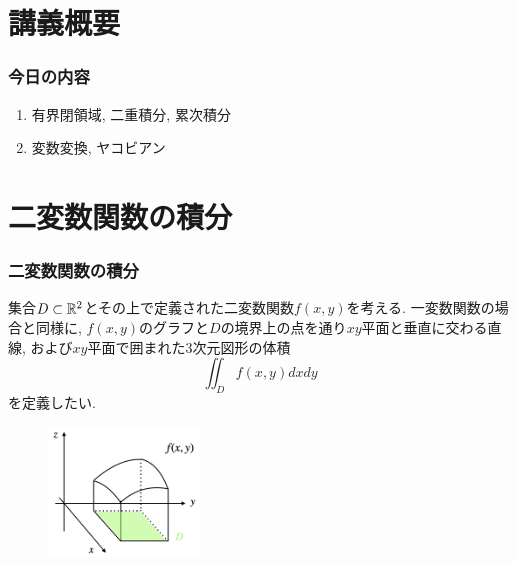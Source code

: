 
\section{講義概要}


\begin{frame}
\frametitle{今日の内容}



\begin{enumerate}
\item 有界閉領域, 二重積分, 累次積分
\item 変数変換, ヤコビアン
\end{enumerate} 



\end{frame}









\section{二変数関数の積分}


\begin{frame}
\frametitle{二変数関数の積分}


集合$D \subset \mathbb{R}^2$とその上で定義された二変数関数$f(x,y)$を考える. 
一変数関数の場合と同様に, $f(x,y)$のグラフと$D$の境界上の点を通り$xy$平面と垂直に交わる直線, および$xy$平面で囲まれた3次元図形の体積
$$
\iint_Df(x,y)dxdy
$$
を定義したい.  

\vspace{-5mm}
\begin{figure}[htbp]
 \begin{center} 
  \includegraphics[width=40mm]{calculus13/volume.png}
 \end{center}
\end{figure}


\end{frame}


